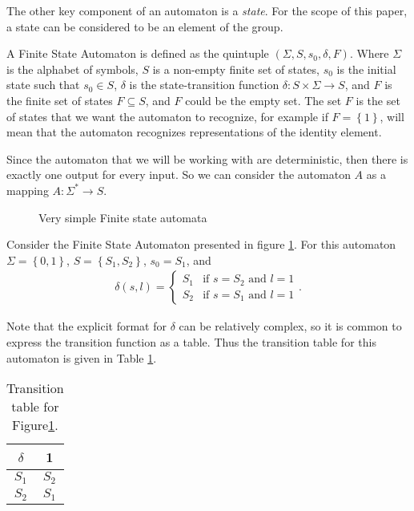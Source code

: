 \documentclass[10pt]{amsart}
\theoremstyle{definition}
\begin{document}
The other key component of an automaton is a \textit{state}. For the scope of
this paper, a state can be considered to be an element of the group.

A Finite State Automaton is defined as the quintuple $\left(\Sigma, S, s_0,
  \delta, F\right)$. Where $\Sigma$ is the alphabet of symbols, $S$ is a
non-empty finite set of states, $s_0$ is the initial state such that $s_0\in
S$, $\delta$ is the state-transition function $\delta:S\times\Sigma\rightarrow
S$, and $F$ is the finite set of states $F\subseteq S$, and $F$ could be the
empty set. The set $F$ is the set of states that we want the automaton to
recognize, for example if $F=\left\{1\right\}$, will mean that the automaton
recognizes representations of the identity element.

Since the automaton that we will be working with are deterministic, then there
is exactly one output for every input. So we can consider the automaton $A$ as
a mapping $A:\Sigma^*\rightarrow S$.

\begin{figure}[htpb]
  \begin{center}
  \end{center}
  \caption{Very simple Finite state automata}%
  \label{fig:auto_ex}
\end{figure}

Consider the Finite State Automaton presented in figure \ref{fig:auto_ex}. For
this automaton $\Sigma=\left\{0, 1\right\}$, $S=\left\{S_1,S_2\right\}$,
$s_0=S_1$, and
\begin{align*}
  \delta(s, l) = \begin{cases}
    S_1 & \text{if }s=S_2\text{ and }l=1\\
    S_2 & \text{if }s=S_1\text{ and }l=1
  \end{cases}.
\end{align*}

Note that the explicit format for $\delta$ can be relatively complex, so it is
common to express the transition function as a table. Thus the transition table
for this automaton is given in Table \ref{tab:auto_ex}.

\begin{table}[htpb]
  \centering
  \caption{Transition table for Figure\ref{fig:auto_ex}.}
  \label{tab:auto_ex}
  \begin{tabular}{c||c}
    $\delta$ & 1\\
    \hline\hline
    $S_1$ & $S_2$\\
    \hline
    $S_2$ & $S_1$\\
  \end{tabular}
\end{table}
\end{document}
